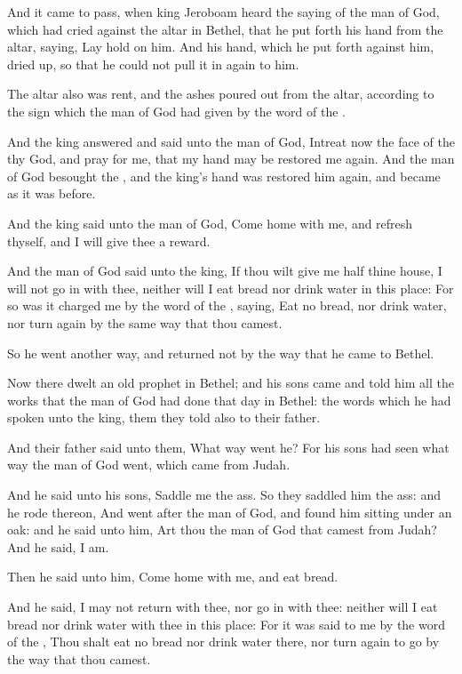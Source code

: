 \Verse And it came to pass, when king Jeroboam heard the saying of the man of God, which had cried against the altar in Bethel, that he put forth his hand from the altar, saying, Lay hold on him. And his hand, which he put forth against him, dried up, so that he could not pull it in again to him.

\Verse The altar also was rent, and the ashes poured out from the altar, according to the sign which the man of God had given by the word of the \LORD.

\Verse And the king answered and said unto the man of God, Intreat now the face of the \LORD thy God, and pray for me, that my hand may be restored me again. And the man of God besought the \LORD, and the king's hand was restored him again, and became as it was before.

\Verse And the king said unto the man of God, Come home with me, and refresh thyself, and I will give thee a reward.

\Verse And the man of God said unto the king, If thou wilt give me half thine house, I will not go in with thee, neither will I eat bread nor drink water in this place: \Verse For so was it charged me by the word of the \LORD, saying, Eat no bread, nor drink water, nor turn again by the same way that thou camest.

\Verse So he went another way, and returned not by the way that he came to Bethel.

\Verse Now there dwelt an old prophet in Bethel; and his sons came and told him all the works that the man of God had done that day in Bethel: the words which he had spoken unto the king, them they told also to their father.

\Verse And their father said unto them, What way went he? For his sons had seen what way the man of God went, which came from Judah.

\Verse And he said unto his sons, Saddle me the ass. So they saddled him the ass: and he rode thereon, \Verse And went after the man of God, and found him sitting under an oak: and he said unto him, Art thou the man of God that camest from Judah? And he said, I am.

\Verse Then he said unto him, Come home with me, and eat bread.

\Verse And he said, I may not return with thee, nor go in with thee: neither will I eat bread nor drink water with thee in this place: \Verse For it was said to me by the word of the \LORD, Thou shalt eat no bread nor drink water there, nor turn again to go by the way that thou camest.

